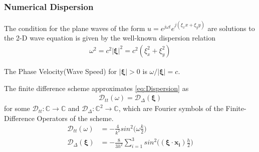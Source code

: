 \documentclass{beamer}
\begin{document}

\begin{frame}
\frametitle{Numerical Dispersion}

The condition for the plane waves of the form $u = e^{j\omega t} e^{j(\xi_x x + \xi_y y)}$ are solutions to the 2-D wave equation is given by the well-known dispersion relation
\begin{align}
\omega^2 = c^2 |\mathbf{\xi}|^2 = c^2 (\xi_x^2 + \xi_y^2) \label{eq:Dispersion}
\end{align}

The Phase Velocity(Wave Speed) for $|\mathbf{\xi}| > 0$ is $\omega / |\mathbf{\xi}| = c$.

The finite difference scheme approximates \eqref{eq:Dispersion} as
\begin{align}
\mathcal{D}_{tt}(\omega) = \mathcal{D}_{\Delta}(\mathbf{\xi}) \label{eq:DispersionFreqDomain}
\end{align}
for some $\mathcal{D}_{tt}: \mathbb{C} \rightarrow \mathbb{C}$ and $\mathcal{D}_{\Delta}: \mathbb{C}^2 \rightarrow \mathbb{C}$, which are Fourier symbols of the Finite-Difference Operators of the scheme. 
\begin{align}
\mathcal{D}_{tt}(\omega) &= -\frac{4}{k^2}sin^2\big(\omega \frac{k}{2}\big)\\
\mathcal{D}_{\Delta}(\mathbf{\xi}) &= -\frac{8}{3h^2} \sum_{i=1}^{3} sin^2\big((\mathbf{\xi}\cdot \mathbf{x_i})\frac{h}{2}\big)
\end{align}
\end{frame}


\end{document}
